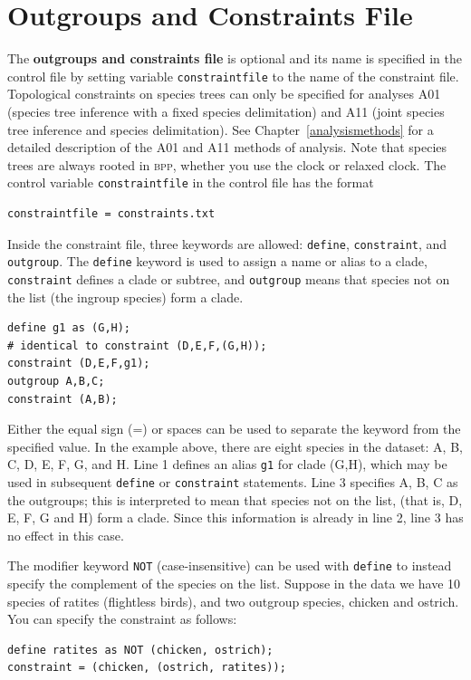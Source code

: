 \documentclass[a4paper]{book}
\numberwithin{equation}{section} \renewcommand{\baselinestretch}{0.55}
\begin{document}
\section{Outgroups and Constraints File}
The \textbf{outgroups and constraints file} is optional and its name is
specified in the control file by setting variable
\texttt{constraintfile} to the name of the constraint file.
Topological constraints on species trees can only be specified for
analyses A01 (species tree inference with a fixed species
delimitation) and A11 (joint species tree inference and species
delimitation). See Chapter~\ref{analysismethods} for a detailed
description of the A01 and A11 methods of analysis.  Note that species
trees are always rooted in \textsc{bpp}, whether you use the clock or
relaxed clock. The control variable \texttt{constraintfile} in the
control file has the format
\begin{verbatim}
constraintfile = constraints.txt
\end{verbatim}
Inside the constraint file, three keywords are allowed:
\texttt{define}, \texttt{constraint}, and \texttt{outgroup}.  The
\texttt{define} keyword is used to assign a name or alias to a clade,
\texttt{constraint} defines a clade or subtree, and \texttt{outgroup}
means that species not on the list (the ingroup species) form a clade.
\begin{verbatim}
define g1 as (G,H);
# identical to constraint (D,E,F,(G,H));
constraint (D,E,F,g1);   
outgroup A,B,C;
constraint (A,B);
\end{verbatim}
Either the equal sign (=) or spaces can be used to separate the keyword from
the specified value. In the example above,
there are eight species in the dataset: A, B, C, D, E, F, G, and H.
Line 1 defines an alias \texttt{g1} for clade (G,H), which may be used
in subsequent \texttt{define} or \texttt{constraint} statements. Line
3 specifies A, B, C as the outgroups; this is interpreted to mean that
species not on the list, (that is, D, E, F, G and H) form a
clade. Since this information is already in line 2, line 3 has no
effect in this case.

The modifier keyword \texttt{NOT} (case-insensitive) can be used with
\texttt{define} to instead specify the complement of the species on the
list. Suppose in the data we have 10 species of ratites (flightless
birds), and two outgroup species, chicken and ostrich. You can specify
the constraint as follows:
\begin{verbatim}
define ratites as NOT (chicken, ostrich);
constraint = (chicken, (ostrich, ratites));
\end{verbatim}
\end{document}
